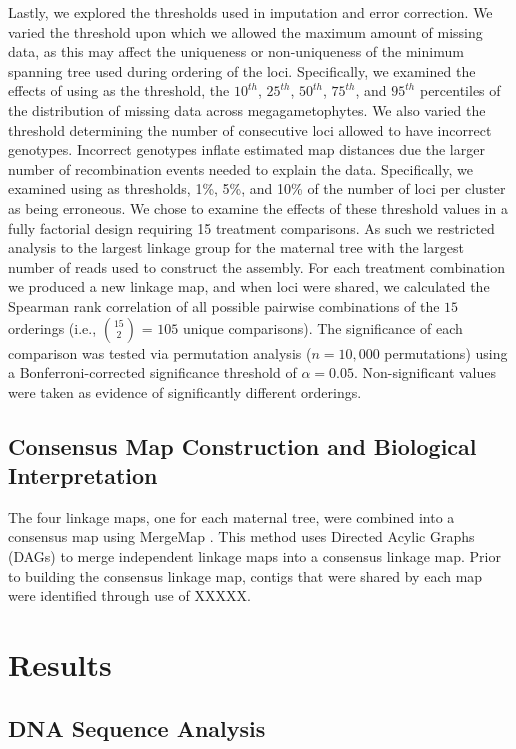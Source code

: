 \documentclass[11pt]{article}
\begin{document}
Lastly, we explored the thresholds used in imputation and error correction. We varied the threshold upon which 
we allowed the maximum amount of missing data, as this may affect the uniqueness 
or non-uniqueness of the minimum spanning tree used during ordering of the loci. Specifically, 
we examined the effects of using as the threshold, the $10^{th}$, $25^{th}$, $50^{th}$, $75^{th}$, and $95^{th}$ percentiles of 
the distribution of missing data across megagametophytes. We also varied the threshold determining 
the number of consecutive loci allowed to have incorrect genotypes. Incorrect genotypes inflate estimated 
map distances due the larger number of recombination events needed to explain the data. Specifically, we 
examined using as thresholds, 1\%, 5\%, and 10\% of the number of loci per cluster as being erroneous. We chose to 
examine the effects of these threshold values in a fully factorial design requiring 15 treatment comparisons. As such we restricted 
analysis to the largest linkage group for the maternal tree with the largest number of reads used to construct 
the assembly. For each treatment combination we produced a new linkage map, and when loci were shared, we calculated 
the Spearman rank correlation of all possible pairwise combinations of the $15$ orderings (i.e., {$15 \choose 2$} = $105$ unique 
comparisons). The significance of each comparison was tested via permutation analysis ($n = 10,000$ permutations) 
using a Bonferroni-corrected significance threshold of $\alpha = 0.05$. Non-significant values were taken as evidence of significantly 
different orderings.

\subsection*{Consensus Map Construction and Biological Interpretation}\label{ss:consensus}
The four linkage maps, one for each maternal tree, were combined into a consensus map using MergeMap \citep{Wu:2008b}. This 
method uses Directed Acylic Graphs (DAGs) to merge independent linkage maps into a consensus linkage map. Prior to building the consensus 
linkage map, contigs that were shared by each map were identified through use of XXXXX.

\section*{Results}

\subsection*{DNA Sequence Analysis}
\end{document}
